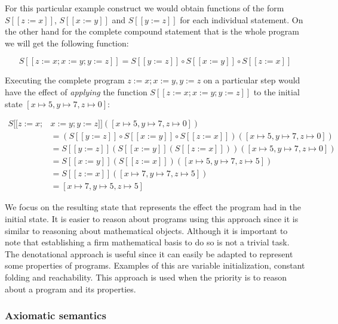 For this particular example construct we would obtain functions of the form $S [\![ z:=x ]\!]$, $S [\![ x:=y ]\!]$ and $S [\![ y:=z ]\!]$ for each individual statement.
On the other hand for the complete compound statement that is the whole program we will get the following function:

\begin{equation*}
S [\![ z:=x; x:=y; y:=z ]\!] = S [\![ y:=z ]\!] \circ S [\![ x:=y ]\!] \circ S [\![ z:=x ]\!]
\end{equation*}

Executing the complete program $z:=x; x:=y, y:=z$ on a particular step would have the effect of \textit{applying} the function $S [\![ z:=x; x:=y; y:=z ]\!]$ to the initial state $[x\mapsto5, y\mapsto7, z\mapsto0]$:

\begin{align*}
S [\![ z:=x; & x:=y; y:=z ]\!]([x\mapsto5, y\mapsto7, z\mapsto0])\\
&= (S [\![ y:=z ]\!] \circ S [\![ x:=y ]\!] \circ S [\![ z:=x ]\!])([x\mapsto5, y\mapsto7, z\mapsto0])\\
&= S [\![ y:=z ]\!](S [\![ x:=y ]\!] (S [\![ z:=x ]\!]))([x\mapsto5, y\mapsto7, z\mapsto0])\\
&= S [\![ x:=y ]\!] (S [\![ z:=x ]\!])([x\mapsto5, y\mapsto7, z\mapsto5])\\
&= S [\![ z:=x ]\!]([x\mapsto7, y\mapsto7, z\mapsto5])\\
&= [x\mapsto7, y\mapsto5, z\mapsto5]
\end{align*}

We focus on the resulting state that represents the effect the program had in the initial state.
It is easier to reason about programs using this approach since it is similar to reasoning about mathematical objects.
Although it is important to note that establishing a firm mathematical basis to do so is not a trivial task.
The denotational approach is useful since it can easily be adapted to represent some properties of programs.
Examples of this are variable initialization, constant folding and reachability.
This approach is used when the priority is to reason about a program and its properties.~\parencite{nielson}

\begin{comment}
what the program does oposed to how it does it. Modifying mathematical objects.
\end{comment}

\subsubsection{Axiomatic semantics}


